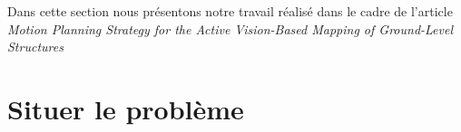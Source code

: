 \label{sec:ugv}

Dans cette section nous présentons notre travail réalisé dans le cadre de l'article \textit{Motion Planning Strategy for the Active Vision-Based Mapping of Ground-Level Structures}

\section{Situer le problème}
